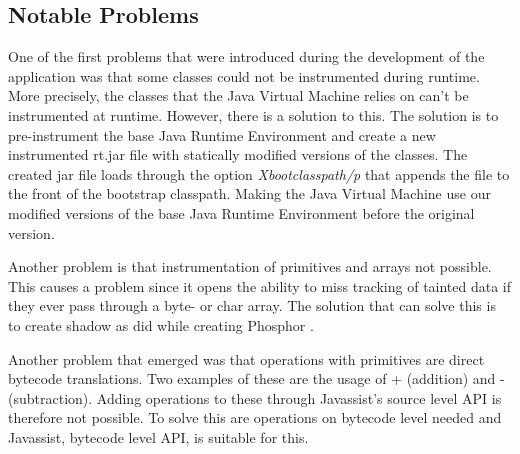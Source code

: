 \subsection{Notable Problems}
\label{NotableProblems}
One of the first problems that were introduced during the development of the application was that some classes could not be instrumented during runtime. More precisely, the classes that the Java Virtual Machine relies on can't be instrumented at runtime. However, there is a solution to this. The solution is to pre-instrument the base Java Runtime Environment and create a new instrumented rt.jar file with statically modified versions of the classes. The created jar file loads through the option \textit{Xbootclasspath/p} that appends the file to the front of the bootstrap classpath. Making the Java Virtual Machine use our modified versions of the base Java Runtime Environment \parencite{xboot} before the original version.

Another problem is that instrumentation of primitives and arrays not possible. This causes a problem since it opens the ability to miss tracking of tainted data if they ever pass through a byte- or char array. The solution that can solve this is to create shadow as \textcite{BellJ.2014PIdd} did while creating Phosphor \parencite{phosphor}. 

Another problem that emerged was that operations with primitives are direct bytecode translations. Two examples of these are the usage of + (addition) and - (subtraction). Adding operations to these through Javassist's source level API is therefore not possible. To solve this are operations on bytecode level needed and Javassist, bytecode level API, is suitable for this. \parencite{Javassist} 
